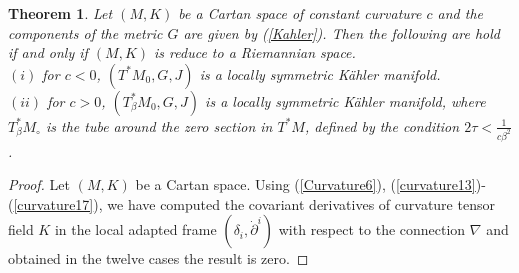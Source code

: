 \documentclass[10pt,a4paper]{article}
\theoremstyle{plain}
\newtheorem{theorem}{Theorem}[section]
\theoremstyle{definition}
\begin{document}
\begin{theorem}\label{THM3}
Let $(M,K)$ be a Cartan space of constant curvature $c$ and the
components of the metric $G$ are given by (\ref{Kahler}).
 Then the following are hold if and only if $(M,K)$ is reduce to a Riemannian space.\\
$(i)$ for $c<0$, $(T^{\ast}M_0,G,J)$ is a locally symmetric K\"{a}hler manifold.\\
$(ii)$ for $c>0$, $(T_{\beta}^{\ast}M_0,G,J)$ is a locally
symmetric K\"{a}hler manifold, where $T_{\beta}^{\ast}M_{\circ}$ is
the tube around the zero section in $T^{\ast}M$, defined by the
condition $2\tau<\frac{1}{c\beta^2}$.
\end{theorem}
\begin{proof}
Let $(M,K)$ be  a Cartan space. Using (\ref{Curvature6}),
(\ref{curvature13})-(\ref{curvature17}), we have computed the
covariant derivatives of curvature tensor field $K$ in the local
adapted frame $(\delta_i,\dot{\partial}^i)$ with respect to the
connection $\nabla$ and  obtained in the twelve cases the result
is zero.


\end{proof}
\end{document}
